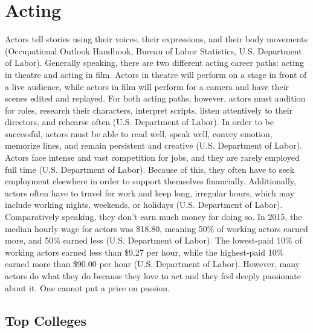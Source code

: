 \chapter{Acting}
\begin{multicols}{2}

Actors tell stories using their voices, their expressions, and their body movements (Occupational Outlook Handbook, Bureau of Labor Statistics, U.S. Department of Labor). Generally speaking, there are two different acting career paths: acting in theatre and acting in film. Actors in theatre will perform on a stage in front of a live audience, while actors in film will perform for a camera and have their scenes edited and replayed. For both acting paths, however, actors must audition for roles, research their characters, interpret scripts, listen attentively to their directors, and rehearse often (U.S. Department of Labor). In order to be successful, actors must be able to read well, speak well, convey emotion, memorize lines, and remain persistent and creative (U.S. Department of Labor). Actors face intense and vast competition for jobs, and they are rarely employed full time (U.S. Department of Labor). Because of this, they often have to seek employment elsewhere in order to support themselves financially. Additionally, actors often have to travel for work and keep long, irregular hours, which may include working nights, weekends, or holidays (U.S. Department of Labor). Comparatively speaking, they don’t earn much money for doing so. In 2015, the median hourly wage for actors was \$18.80, meaning 50\% of working actors earned more, and 50\% earned less (U.S. Department of Labor). The lowest-paid 10\% of working actors earned less than \$9.27 per hour, while the highest-paid 10\% earned more than \$90.00 per hour (U.S. Department of Labor). However, many actors do what they do because they love to act and they feel deeply passionate about it. One cannot put a price on passion. 
\end{multicols}

\section{Top Colleges}

